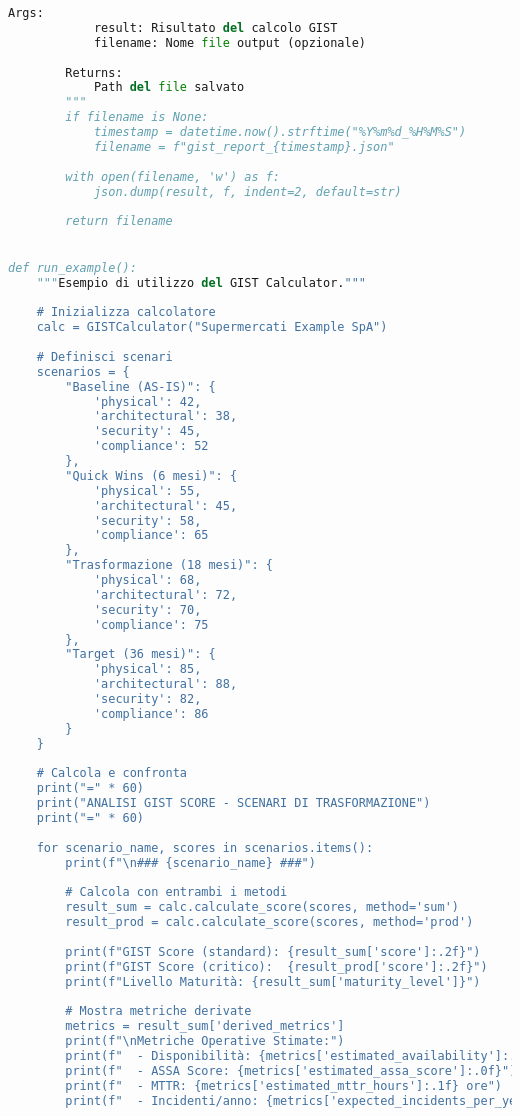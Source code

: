 \begin{lstlisting}[language=Python, caption={Implementazione completa GIST Calculator con validazione e reporting}]
        Args:
            result: Risultato del calcolo GIST
            filename: Nome file output (opzionale)
            
        Returns:
            Path del file salvato
        """
        if filename is None:
            timestamp = datetime.now().strftime("%Y%m%d_%H%M%S")
            filename = f"gist_report_{timestamp}.json"
        
        with open(filename, 'w') as f:
            json.dump(result, f, indent=2, default=str)
        
        return filename
    

def run_example():
    """Esempio di utilizzo del GIST Calculator."""
    
    # Inizializza calcolatore
    calc = GISTCalculator("Supermercati Example SpA")
    
    # Definisci scenari
    scenarios = {
        "Baseline (AS-IS)": {
            'physical': 42,
            'architectural': 38,
            'security': 45,
            'compliance': 52
        },
        "Quick Wins (6 mesi)": {
            'physical': 55,
            'architectural': 45,
            'security': 58,
            'compliance': 65
        },
        "Trasformazione (18 mesi)": {
            'physical': 68,
            'architectural': 72,
            'security': 70,
            'compliance': 75
        },
        "Target (36 mesi)": {
            'physical': 85,
            'architectural': 88,
            'security': 82,
            'compliance': 86
        }
    }
    
    # Calcola e confronta
    print("=" * 60)
    print("ANALISI GIST SCORE - SCENARI DI TRASFORMAZIONE")
    print("=" * 60)
    
    for scenario_name, scores in scenarios.items():
        print(f"\n### {scenario_name} ###")
        
        # Calcola con entrambi i metodi
        result_sum = calc.calculate_score(scores, method='sum')
        result_prod = calc.calculate_score(scores, method='prod')
        
        print(f"GIST Score (standard): {result_sum['score']:.2f}")
        print(f"GIST Score (critico):  {result_prod['score']:.2f}")
        print(f"Livello Maturità: {result_sum['maturity_level']}")
        
        # Mostra metriche derivate
        metrics = result_sum['derived_metrics']
        print(f"\nMetriche Operative Stimate:")
        print(f"  - Disponibilità: {metrics['estimated_availability']:.3f}%")
        print(f"  - ASSA Score: {metrics['estimated_assa_score']:.0f}")
        print(f"  - MTTR: {metrics['estimated_mttr_hours']:.1f} ore")
        print(f"  - Incidenti/anno: {metrics['expected_incidents_per_year']:.0f}")
        

\end{lstlisting}
